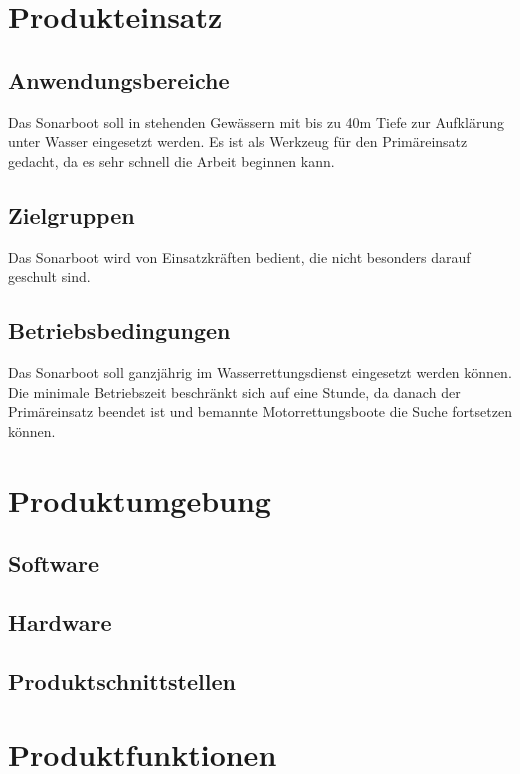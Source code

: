 \documentclass[a4paper]{article}
\begin{document}
\section{Produkteinsatz}

\subsection{Anwendungsbereiche}

Das Sonarboot soll in stehenden Gewässern mit bis zu 40m Tiefe zur Aufklärung unter Wasser eingesetzt 
werden. Es ist als Werkzeug für den Primäreinsatz gedacht, da es sehr schnell die Arbeit beginnen kann.

\subsection{Zielgruppen}

Das Sonarboot wird von Einsatzkräften bedient, die nicht besonders darauf geschult sind.

\subsection{Betriebsbedingungen}

Das Sonarboot soll ganzjährig im Wasserrettungsdienst eingesetzt werden können. Die minimale 
Betriebszeit beschränkt sich auf eine Stunde, da danach der Primäreinsatz beendet ist und 
bemannte Motorrettungsboote die Suche fortsetzen können.

\section{Produktumgebung}

\subsection{Software}

\subsection{Hardware}

\subsection{Produktschnittstellen}

\section{Produktfunktionen}
\end{document}
